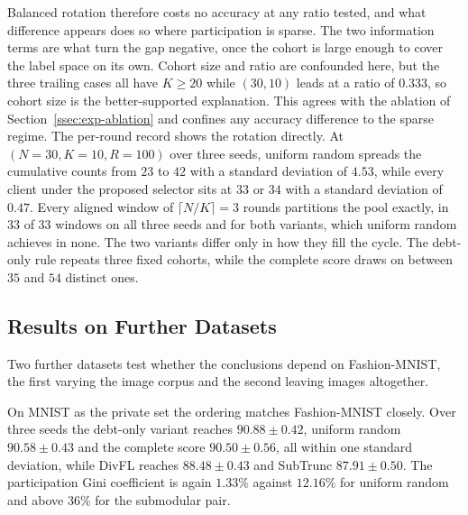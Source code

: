 \documentclass[journal]{IEEEtran}
\newcommand{\rev}[1]{#1}
\begin{document}
\rev{Balanced rotation therefore costs no accuracy at any ratio tested, and what difference appears does so where participation is sparse. The two information terms are what turn the gap negative, once the cohort is large enough to cover the label space on its own. Cohort size and ratio are confounded here, but the three trailing cases all have $K \ge 20$ while $(30,10)$ leads at a ratio of $0.333$, so cohort size is the better-supported explanation. This agrees with the ablation of Section~\ref{ssec:exp-ablation} and confines any accuracy difference to the sparse regime. The per-round record shows the rotation directly. At $(N = 30, K = 10, R = 100)$ over three seeds, uniform random spreads the cumulative counts from $23$ to $42$ with a standard deviation of $4.53$, while every client under the proposed selector sits at $33$ or $34$ with a standard deviation of $0.47$. Every aligned window of $\lceil N/K \rceil = 3$ rounds partitions the pool exactly, in $33$ of $33$ windows on all three seeds and for both variants, which uniform random achieves in none. The two variants differ only in how they fill the cycle. The debt-only rule repeats three fixed cohorts, while the complete score draws on between $35$ and $54$ distinct ones.}

\subsection{Results on Further Datasets}
\label{ssec:exp-cross-dataset}

\rev{Two further datasets test whether the conclusions depend on Fashion-MNIST, the first varying the image corpus and the second leaving images altogether.}

\rev{On MNIST as the private set the ordering matches Fashion-MNIST closely. Over three seeds the debt-only variant reaches $90.88 \pm 0.42$, uniform random $90.58 \pm 0.43$ and the complete score $90.50 \pm 0.56$, all within one standard deviation, while DivFL reaches $88.48 \pm 0.43$ and SubTrunc $87.91 \pm 0.50$. The participation Gini coefficient is again $1.33\%$ against $12.16\%$ for uniform random and above $36\%$ for the submodular pair.}
\end{document}

